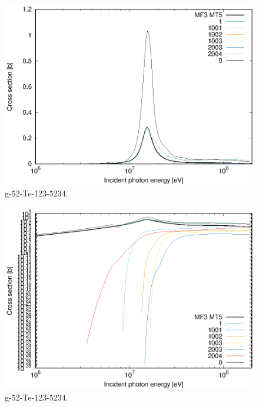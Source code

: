 \begin{figure}
 \includegraphics[width=\linewidth]{eps/g_52-Te-123_5234.eps}
  \caption{g-52-Te-123-5234.}
\end{figure}
\begin{figure}
 \includegraphics[width=\linewidth]{eps-log/g_52-Te-123_5234.eps}
 \caption{g-52-Te-123-5234.}
\end{figure}
\newpage \clearpage

